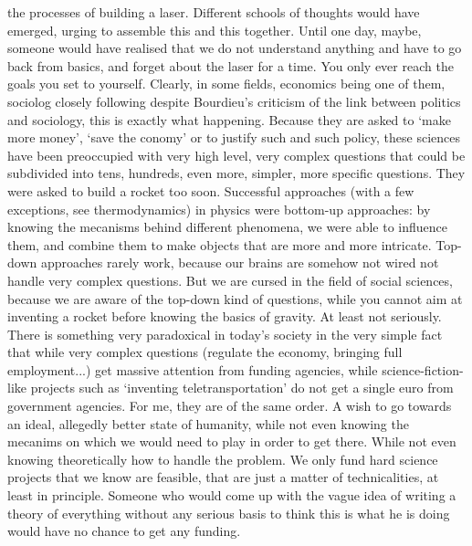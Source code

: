 the processes of building a laser. Different schools of thoughts would have
emerged, urging to assemble this and this together. Until one day, maybe,
someone would have realised that we do not understand anything and have to go
back from basics, and forget about the laser for a time.
You only ever reach the goals you set to yourself.
Clearly, in some fields, economics being one of them, sociolog closely following
despite Bourdieu's criticism of the link between politics and sociology, this is
exactly what happening. Because they are asked to `make more money', `save the
conomy' or to justify such and such policy, these sciences have been preoccupied
with very high level, very complex questions that could be subdivided into tens,
hundreds, even more, simpler, more specific questions. They were asked to build
a rocket too soon. Successful approaches (with a few exceptions, see
thermodynamics) in physics were bottom-up approaches: by knowing the mecanisms
behind different phenomena, we were able to influence them, and combine them to
make objects that are more and more intricate. Top-down approaches rarely work,
because our brains are somehow not wired not handle very complex questions. But
we are cursed in the field of social sciences, because we are aware of the
top-down kind of questions, while you cannot aim at inventing a rocket before
knowing the basics of gravity. At least not seriously. There is something very
paradoxical in today's society in the very simple fact that while very complex
questions (regulate the economy, bringing full employment...) get massive
attention from funding agencies, while science-fiction-like projects such as
`inventing teletransportation' do not get a single euro from government
agencies. For me, they are of the same order. A wish to go towards an ideal,
allegedly better state of humanity, while not even knowing the mecanims on which
we would need to play in order to get there. While not even knowing
theoretically how to handle the problem. We only fund hard science projects that
we know are feasible, that are just a matter of technicalities, at least in
principle. Someone who would come up with the vague idea of writing a theory of
everything without any serious basis to think this is what he is doing would
have no chance to get any funding.\\
